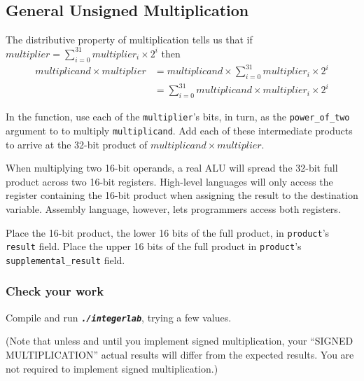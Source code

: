 \subsection{General Unsigned Multiplication}

The distributive property of multiplication tells us that if $multiplier = \sum_{i=0}^{31}multiplier_i \times 2^i$ then
\begin{align*}
    multiplicand \times multiplier  & = multiplicand \times \sum_{i=0}^{31}multiplier_i \times 2^i \\
                                    & = \sum_{i=0}^{31} multiplicand \times multiplier_i \times 2^i
\end{align*}

In the  function, use each of the \lstinline{multiplier}'s bits, in turn, as the \lstinline{power_of_two} argument to  to multiply \lstinline{multiplicand}.
Add each of these intermediate products to arrive at the 32-bit product of $multiplicand \times multiplier$.

When multiplying two 16-bit operands, a real ALU will spread the 32-bit full product across two 16-bit registers.
High-level languages will only access the register containing the 16-bit product when assigning the result to the destination variable.
Assembly language, however, lets programmers access both registers.

Place the 16-bit product, the lower 16 bits of the full product, in \lstinline{product}'s \lstinline{result} field.
Place the upper 16 bits of the full product in \lstinline{product}'s \lstinline{supplemental_result} field.


\subsubsection*{Check your work}

Compile and run \texttt{\textbf{\textit{./integerlab}}}, trying a few values.

(Note that unless and until you implement signed multiplication, your ``SIGNED MULTIPLICATION'' actual results will differ from the expected results.
You are not required to implement signed multiplication.)

